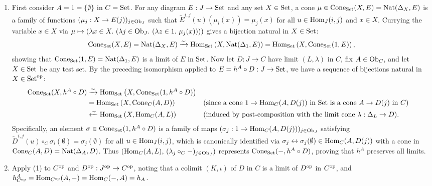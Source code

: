 \documentclass[10pt,a4paper]{article}
\begin{document}
\begin{enumerate}
\item First consider $A = 1 = \{\emptyset\}$ in $C = {\textrm{Set}}$. For any diagram $E : J \to {\textrm{Set}}$ and any set $X \in {\textrm{Set}}$, a cone $\mu \in {\mathrm{Cone}}_{{\textrm{Set}}}(X, E) = {\textrm{Nat}}(\Delta_X, E)$ is a family of functions $(\mu_j : X \to E(j))_{j \in {\textrm{Ob}}_J}$ such that $\widetilde{E}^{i,j}(u)(\mu_i(x)) = \mu_j(x)$ for all $u \in {\textrm{Hom}}_J(i, j)$ and $x \in X$. Currying the variable $x \in X$ via $\mu \mapsto (\lambda x \in X.\ (\lambda j \in {\textrm{Ob}}_J.\ (\lambda z \in 1.\ \mu_j(x))))$ gives a bijection natural in $X \in {\textrm{Set}}$:
$${\mathrm{Cone}}_{{\textrm{Set}}}(X, E) = {\textrm{Nat}}(\Delta_X, E) \xrightarrow{\sim} {\textrm{Hom}}_{\textrm{Set}}\left(X, {\textrm{Nat}}(\Delta_1, E)\right) = {\textrm{Hom}}_{\textrm{Set}}\left(X, {\mathrm{Cone}}_{{\textrm{Set}}}(1, E)\right),$$
showing that ${\mathrm{Cone}}_{{\textrm{Set}}}(1, E) = {\textrm{Nat}}(\Delta_1, E)$ is a limit of $E$ in ${\textrm{Set}}$.
Now let $D : J \to C$ have limit $(L, \lambda)$ in $C$, fix $A \in {\textrm{Ob}}_C$, and let $X \in {\textrm{Set}}$ be any test set. By the preceding isomorphism applied to $E = h^A \circ D : J \to {\textrm{Set}}$, we have a sequence of bijections natural in $X \in {\textrm{Set}}^{\textrm{op}}$:
\begin{align*}
{\mathrm{Cone}}_{{\textrm{Set}}}(X, h^A \circ D) &\xrightarrow{\sim} {\textrm{Hom}}_{\textrm{Set}}\left(X, {\mathrm{Cone}}_{{\textrm{Set}}}(1, h^A \circ D)\right) \\
&= {\textrm{Hom}}_{\textrm{Set}}\left(X, {\mathrm{Cone}}_C(A, D)\right) && \text{(since a cone $1 \to {\textrm{Hom}}_C(A, D(j))$ in ${\textrm{Set}}$ is a cone $A \to D(j)$ in $C$)} \\
&\xleftarrow{\sim} {\textrm{Hom}}_{\textrm{Set}}\left(X, {\textrm{Hom}}_C(A, L)\right) && \text{(induced by post-composition with the limit cone $\lambda : \Delta_L \to D$)}.
\end{align*}
Specifically, an element $\sigma \in {\mathrm{Cone}}_{{\textrm{Set}}}(1, h^A \circ D)$ is a family of maps $(\sigma_j : 1 \to {\textrm{Hom}}_C(A, D(j)))_{j \in {\textrm{Ob}}_J}$ satisfying $\widetilde{D}^{i,j}(u) \circ_C \sigma_i(\emptyset) = \sigma_j(\emptyset)$ for all $u \in {\textrm{Hom}}_J(i, j)$, which is canonically identified via $\sigma_j \leftrightarrow \sigma_j(\emptyset) \in {\textrm{Hom}}_C(A, D(j))$ with a cone in ${\mathrm{Cone}}_C(A, D) = {\textrm{Nat}}(\Delta_A, D)$. Thus $\left({\textrm{Hom}}_C(A, L),\, (\lambda_j \circ_C -)_{j \in {\textrm{Ob}}_J}\right)$ represents ${\mathrm{Cone}}_{{\textrm{Set}}}(-, h^A \circ D)$, proving that $h^A$ preserves all limits.
\item Apply (1) to $C^{\textrm{op}}$ and $D^{\textrm{op}} : J^{\textrm{op}} \to C^{\textrm{op}}$, noting that a colimit $(K, \iota)$ of $D$ in $C$ is a limit of $D^{\textrm{op}}$ in $C^{\textrm{op}}$, and $h^{A}_{C^{\textrm{op}}} = {\textrm{Hom}}_{C^{\textrm{op}}}(A, -) = {\textrm{Hom}}_C(-, A) = h_A$.
\end{enumerate}
\myqed
\end{document}
